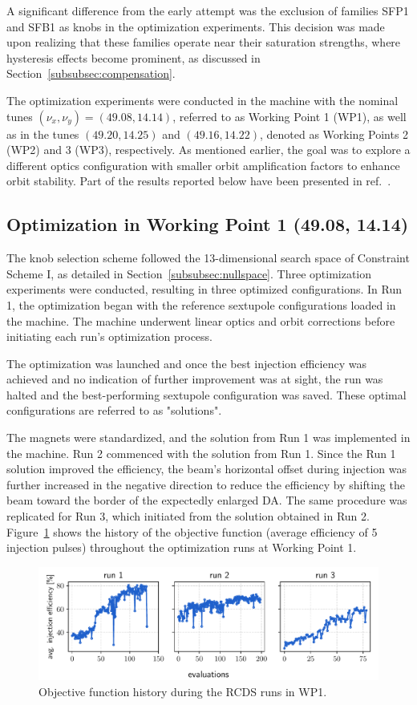 A significant difference from the early attempt was the exclusion of families SFP1 and SFB1 as knobs in the optimization experiments. This decision was made upon realizing that these families operate near their saturation strengths, where hysteresis effects become prominent, as discussed in Section~\ref{subsubsec:compensation}.

The optimization experiments were conducted in the machine with the nominal tunes $(\nu_x,\nu_y)=(49.08, 14.14)$, referred to as Working Point 1 (WP1), as well as in the tunes $(49.20, 14.25)$ and $(49.16, 14.22)$, denoted as Working Points 2 (WP2) and 3 (WP3), respectively. As mentioned earlier, the goal was to explore a different optics configuration with smaller orbit amplification factors to enhance orbit stability. Part of the results reported below have been presented in ref.~\cite{velloso_online_2023}.

\subsection{Optimization in Working Point 1 (49.08, 14.14)}
The knob selection scheme followed the 13-dimensional search space of Constraint Scheme I, as detailed in Section~\ref{subsubsec:nullspace}. Three optimization experiments were conducted, resulting in three optimized configurations. In Run 1, the optimization began with the reference sextupole configurations loaded in the machine. The machine underwent linear optics and orbit corrections before initiating each run's optimization process.

The optimization was launched and once the best injection efficiency was achieved and no indication of further improvement was at sight, the run was halted and the best-performing sextupole configuration was saved. These optimal configurations are referred to as "solutions".

The magnets were standardized, and the solution from Run 1 was implemented in the machine. Run 2 commenced with the solution from Run 1. Since the Run 1 solution improved the efficiency, the beam's horizontal offset during injection was further increased in the negative direction to reduce the efficiency by shifting the beam toward the border of the expectedly enlarged DA. The same procedure was replicated for Run 3, which initiated from the solution obtained in Run 2. Figure~\ref{fig:wp1_history} shows the history of the objective function (average efficiency of 5 injection pulses) throughout the optimization runs at Working Point 1.
\begin{figure}[tb]
    \centering
    \includegraphics[width=\columnwidth]{Images/wp1_objfunc_hist.pdf}
    \caption[Objective function history during the RCDS runs in WP1.]{Objective function history during the RCDS runs in WP1.}
    \label{fig:wp1_history}
\end{figure}
